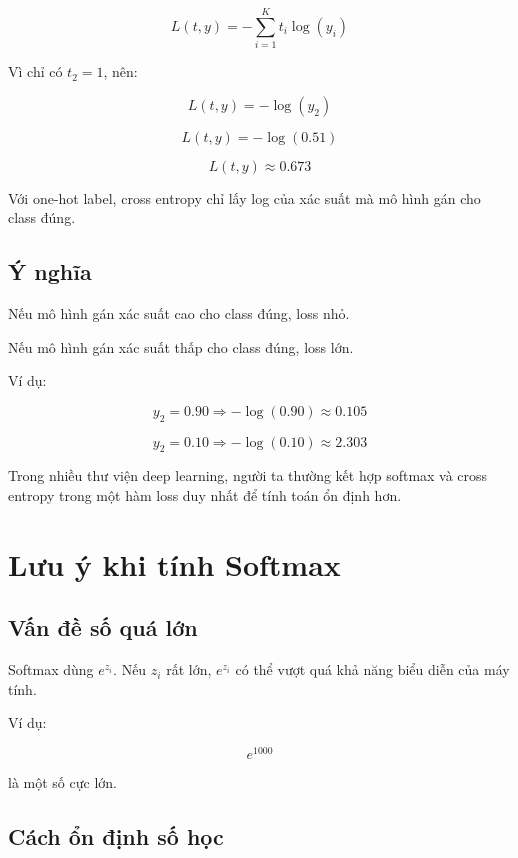 \documentclass[12pt,a4paper]{report}
\begin{document}
\[
    L(t,y)
    =
    -\sum_{i=1}^{K} t_i\log(y_i)
\]

Vì chỉ có $t_2=1$, nên:

\[
    L(t,y)=-\log(y_2)
\]

\[
    L(t,y)=-\log(0.51)
\]

\[
    L(t,y)\approx 0.673
\]

\begin{ghinho}
Với one-hot label, cross entropy chỉ lấy log của xác suất mà mô hình gán cho class đúng.
\end{ghinho}

\section{Ý nghĩa}

Nếu mô hình gán xác suất cao cho class đúng, loss nhỏ.

Nếu mô hình gán xác suất thấp cho class đúng, loss lớn.

Ví dụ:

\[
    y_2=0.90
    \Rightarrow
    -\log(0.90)\approx 0.105
\]

\[
    y_2=0.10
    \Rightarrow
    -\log(0.10)\approx 2.303
\]

\begin{luuy}
Trong nhiều thư viện deep learning, người ta thường kết hợp softmax và cross entropy trong một hàm loss duy nhất để tính toán ổn định hơn.
\end{luuy}

\chapter{Lưu ý khi tính Softmax}

\section{Vấn đề số quá lớn}

Softmax dùng $e^{z_i}$. Nếu $z_i$ rất lớn, $e^{z_i}$ có thể vượt quá khả năng biểu diễn của máy tính.

Ví dụ:

\[
    e^{1000}
\]

là một số cực lớn.

\section{Cách ổn định số học}
\end{document}
